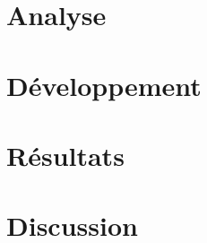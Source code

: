 \documentclass[a4paper,12pt,notitlepage]{report}
\begin{document}

\vspace*{\fill}

\vspace*{\fill}
\tableofcontents




\chapter{Analyse}



\chapter{Développement}







\chapter{Résultats}



\chapter{Discussion}




\nocite{*} %
\printbibliography
\end{document}
